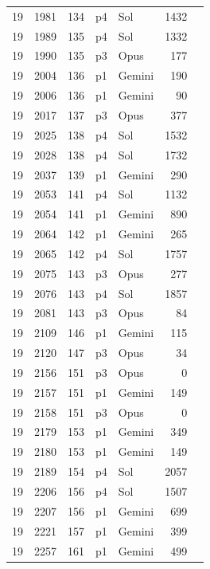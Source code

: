 \begin{longtable}{r r r l l r L{2.3in}}
19 & 1981 & 134 & p4 & Sol & 1432 &  \\
19 & 1989 & 135 & p4 & Sol & 1332 &  \\
19 & 1990 & 135 & p3 & Opus & 177 &  \\
19 & 2004 & 136 & p1 & Gemini & 190 &  \\
19 & 2006 & 136 & p1 & Gemini & 90 &  \\
19 & 2017 & 137 & p3 & Opus & 377 &  \\
19 & 2025 & 138 & p4 & Sol & 1532 &  \\
19 & 2028 & 138 & p4 & Sol & 1732 &  \\
19 & 2037 & 139 & p1 & Gemini & 290 &  \\
19 & 2053 & 141 & p4 & Sol & 1132 &  \\
19 & 2054 & 141 & p1 & Gemini & 890 &  \\
19 & 2064 & 142 & p1 & Gemini & 265 &  \\
19 & 2065 & 142 & p4 & Sol & 1757 &  \\
19 & 2075 & 143 & p3 & Opus & 277 &  \\
19 & 2076 & 143 & p4 & Sol & 1857 &  \\
19 & 2081 & 143 & p3 & Opus & 84 &  \\
19 & 2109 & 146 & p1 & Gemini & 115 &  \\
19 & 2120 & 147 & p3 & Opus & 34 &  \\
19 & 2156 & 151 & p3 & Opus & 0 &  \\
19 & 2157 & 151 & p1 & Gemini & 149 &  \\
19 & 2158 & 151 & p3 & Opus & 0 &  \\
19 & 2179 & 153 & p1 & Gemini & 349 &  \\
19 & 2180 & 153 & p1 & Gemini & 149 &  \\
19 & 2189 & 154 & p4 & Sol & 2057 &  \\
19 & 2206 & 156 & p4 & Sol & 1507 &  \\
19 & 2207 & 156 & p1 & Gemini & 699 &  \\
19 & 2221 & 157 & p1 & Gemini & 399 &  \\
19 & 2257 & 161 & p1 & Gemini & 499 &  \\

\end{longtable}
